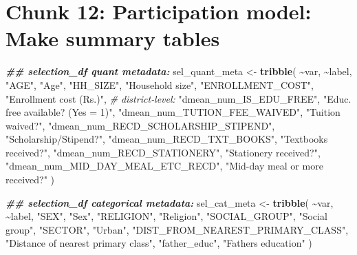 \documentclass[
]{article}
\newenvironment{Shaded}{\begin{snugshade}}{\end{snugshade}}
\newcommand{\CommentTok}[1]{\textcolor[rgb]{0.56,0.35,0.01}{\textit{#1}}}
\newcommand{\DocumentationTok}[1]{\textcolor[rgb]{0.56,0.35,0.01}{\textbf{\textit{#1}}}}
\newcommand{\FunctionTok}[1]{\textcolor[rgb]{0.13,0.29,0.53}{\textbf{#1}}}
\newcommand{\NormalTok}[1]{#1}
\newcommand{\OtherTok}[1]{\textcolor[rgb]{0.56,0.35,0.01}{#1}}
\newcommand{\SpecialCharTok}[1]{\textcolor[rgb]{0.81,0.36,0.00}{\textbf{#1}}}
\newcommand{\StringTok}[1]{\textcolor[rgb]{0.31,0.60,0.02}{#1}}
\begin{document}
\section*{Chunk 12: Participation model: Make summary tables}\label{chunk-12-participation-model-make-summary-tables}

\begin{Shaded}
\begin{Highlighting}[]
\DocumentationTok{\#\# selection\_df quant metadata:}
\NormalTok{sel\_quant\_meta }\OtherTok{\textless{}{-}} \FunctionTok{tribble}\NormalTok{(}
  \SpecialCharTok{\textasciitilde{}}\NormalTok{var, }\SpecialCharTok{\textasciitilde{}}\NormalTok{label,              }
  \StringTok{"AGE"}\NormalTok{, }\StringTok{"Age"}\NormalTok{,}
  \StringTok{"HH\_SIZE"}\NormalTok{, }\StringTok{"Household size"}\NormalTok{,}
  \StringTok{"ENROLLMENT\_COST"}\NormalTok{, }\StringTok{"Enrollment cost (Rs.)"}\NormalTok{,}
  \CommentTok{\# district‐level:}
  \StringTok{"dmean\_num\_IS\_EDU\_FREE"}\NormalTok{, }\StringTok{"Educ. free available? (Yes = 1)"}\NormalTok{,}
  \StringTok{"dmean\_num\_TUTION\_FEE\_WAIVED"}\NormalTok{, }\StringTok{"Tuition waived?"}\NormalTok{,}
  \StringTok{"dmean\_num\_RECD\_SCHOLARSHIP\_STIPEND"}\NormalTok{, }\StringTok{"Scholarship/Stipend?"}\NormalTok{,}
  \StringTok{"dmean\_num\_RECD\_TXT\_BOOKS"}\NormalTok{, }\StringTok{"Textbooks received?"}\NormalTok{,}
  \StringTok{"dmean\_num\_RECD\_STATIONERY"}\NormalTok{, }\StringTok{"Stationery received?"}\NormalTok{,}
  \StringTok{"dmean\_num\_MID\_DAY\_MEAL\_ETC\_RECD"}\NormalTok{, }\StringTok{"Mid{-}day meal or more received?"}
\NormalTok{)}

\DocumentationTok{\#\# selection\_df categorical metadata:}
\NormalTok{sel\_cat\_meta }\OtherTok{\textless{}{-}} \FunctionTok{tribble}\NormalTok{(}
  \SpecialCharTok{\textasciitilde{}}\NormalTok{var, }\SpecialCharTok{\textasciitilde{}}\NormalTok{label,}
  \StringTok{"SEX"}\NormalTok{, }\StringTok{"Sex"}\NormalTok{,}
  \StringTok{"RELIGION"}\NormalTok{, }\StringTok{"Religion"}\NormalTok{,}
  \StringTok{"SOCIAL\_GROUP"}\NormalTok{, }\StringTok{"Social group"}\NormalTok{,}
  \StringTok{"SECTOR"}\NormalTok{, }\StringTok{"Urban"}\NormalTok{,}
  \StringTok{"DIST\_FROM\_NEAREST\_PRIMARY\_CLASS"}\NormalTok{, }\StringTok{"Distance of nearest primary class"}\NormalTok{,}
  \StringTok{"father\_educ"}\NormalTok{, }\StringTok{"Father\textquotesingle{}s education"}
\NormalTok{)}


\end{Highlighting}
\end{Shaded}
\end{document}
